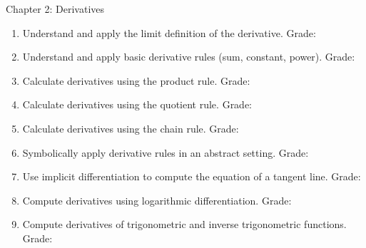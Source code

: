 \documentclass[11pt,letterpaper]{amsart}
\begin{document}
Chapter 2: Derivatives %
\begin{enumerate} 
\item Understand and apply the limit definition of the derivative.\hspace*{\fill} Grade:  \quad {} \quad {}
\item Understand and apply basic derivative rules (sum, constant, power).\hspace*{\fill} Grade:  \quad {} \quad {}
\item Calculate derivatives using the product rule.\hspace*{\fill} Grade:  \quad {} \quad {}
\item Calculate derivatives using the quotient rule.\hspace*{\fill} Grade:  \quad {} \quad {}
\item Calculate derivatives using the chain rule.\hspace*{\fill} Grade:  \quad {} \quad {}
\item Symbolically apply derivative rules in an abstract setting.\hspace*{\fill} Grade:  \quad {} \quad {}
\item Use implicit differentiation to compute the equation of a tangent line.\hspace*{\fill} Grade:  \quad {} \quad {}
\item Compute derivatives using logarithmic differentiation.\hspace*{\fill} Grade:  \quad {} \quad {}
\item Compute derivatives of trigonometric and inverse trigonometric functions.\hspace*{\fill} Grade:  \quad {} \quad {}
\end{enumerate}
%
\bigskip
\end{document}
